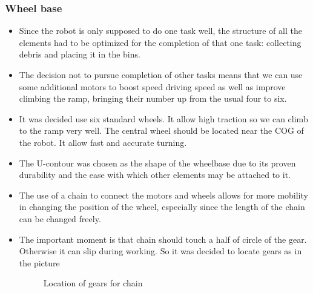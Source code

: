 \subsubsection{Wheel base}
\begin{itemize}
\item Since the robot is only supposed to do one task well, the structure of all the elements had to be optimized for the completion of that one task: collecting debris and placing it in the bins.

\item The decision not to pursue completion of other tasks means that we can use some additional motors to boost speed driving speed as well as improve climbing the ramp, bringing their number up from the usual four to six.

\item It was decided use six standard wheels. It allow high traction so we can climb to the ramp very well. The central wheel should be located near the COG of the robot. It allow fast and accurate turning. 

\item The U-contour was chosen as the shape of the wheelbase due to its proven durability and the ease with which other elements may be attached to it.

\item The use of a chain to connect the motors and wheels allows for more mobility in changing the position of the wheel, especially since the length of the chain can be changed freely.

\item The important moment is that chain should touch a half of circle of the gear. Otherwise it can slip during working. So it was decided to locate gears as in the picture
\begin{figure}[H]
	\begin{minipage}[h]{1\linewidth}
		\caption{Location of gears for chain}
	\end{minipage}
\end{figure} 




\end{itemize}
